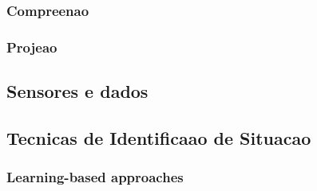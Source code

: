 \documentclass[12pt,a4paper,compsoc]{IEEEtran}
\begin{document}
\subsubsection{Compreenao}
\subsubsection{Projeao}

\subsection{Sensores e dados}

\subsection{Tecnicas de Identificaao de Situacao}

\subsubsection{Learning-based approaches}
\end{document}
